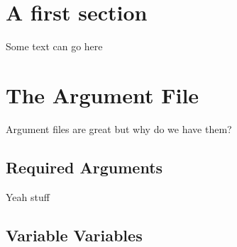 \documentclass[10pt]{article}
\begin{document}
\section{A first section}
Some text can go here

\section{The Argument File}
Argument files are great but why do we have them?
\subsection{Required Arguments}
Yeah stuff
\subsection{Variable Variables}
\end{document}
